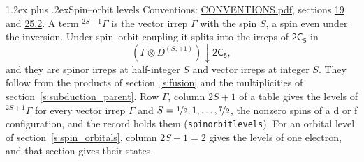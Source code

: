 \documentclass[10pt,a4paper]{article}
\makeatletter
\renewcommand\section{\@startsection{section}{1}{\z@}{-3ex plus -1ex minus -.2ex}%
  {1.2ex plus .2ex}{\normalfont\large\sffamily\bfseries\color{parttitle}}}
\numberwithin{equation}{section}
\newcommand{\grp}[1]{\mathsf{#1}}
\newcommand{\restr}[2]{#1\!\downarrow#2}
\newcommand{\irrJp}[2]{D^{(#1,#2)}}
\newcommand{\irrprod}{\otimes}
\newcommand{\term}[2]{{}^{#1}#2}
\makeatother
\begin{document}
\section{Spin--orbit levels}\label{s:spin_orbit}
Conventions: \href{../../CONVENTIONS.pdf}{CONVENTIONS.pdf}, sections \href{../../../rotation/CONVENTIONS.pdf\#conv.19}{19} and \href{../../CONVENTIONS.pdf\#conv.25.2}{25.2}.
\leavevmode\label{n:local.spin}\label{n:symbol.term}A term $\term{2S+1}{\Gamma}$ is the vector irrep $\Gamma$ with the spin $S$, a spin even under the inversion. Under spin--orbit coupling it splits into the irreps of $\grp{2C_{5}}$ in
\begin{equation}\label{e:spinorbit}\restr{(\Gamma \irrprod \irrJp{S}{+1})}{\grp{2C_{5}}},\end{equation}
and they are spinor irreps at half-integer $S$ and vector irreps at integer $S$. They follow from the products of section~\ref{s:fusion} and the multiplicities of section~\ref{s:subduction_parent}. Row $\Gamma$, column $2S + 1$ of a table gives the levels of $\term{2S+1}{\Gamma}$ for every vector irrep $\Gamma$ and $S = \nicefrac{1}{2}, 1, \dots, \nicefrac{7}{2}$, the nonzero spins of a d or f configuration, and the record holds them (\texttt{spinorbitlevels}). For an orbital level of section~\ref{s:spin_orbitals}, column $2S + 1 = 2$ gives the levels of one electron, and that section gives their states.
\end{document}
